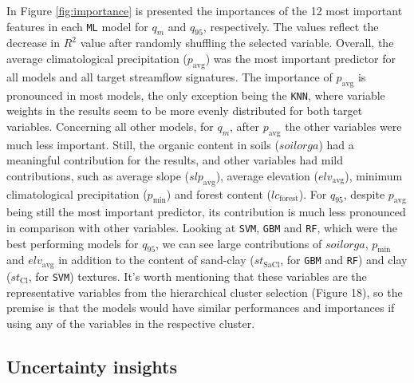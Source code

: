 \documentclass[12pt]{article}
\begin{document}
\par In Figure \ref{fig:importance} is presented the importances of the 12 most important features in each \texttt{ML} model for $q_{m}$ and $q_{95}$, respectively. The values reflect the decrease in $R^2$ value after randomly shuffling the selected variable. Overall, the average climatological precipitation ($p_{\text{avg}}$) was the most important predictor for all models and all target streamflow signatures. The importance of $p_{\text{avg}}$ is pronounced in most models, the only exception being the \texttt{KNN}, where variable weights in the results seem to be more evenly distributed for both target variables. Concerning all other models, for $q_{m}$, after $p_{\text{avg}}$ the other variables were much less important. Still, the organic content in soils ($soilorga$) had a meaningful contribution for the results, and other variables had mild contributions, such as average slope ($slp_{\text{avg}}$), average elevation ($elv_{\text{avg}}$), minimum climatological precipitation ($p_{\text{min}}$) and forest content ($lc_{\text{forest}}$). For $q_{95}$, despite $p_{\text{avg}}$ being still the most important predictor, its contribution is much less pronounced in comparison with other variables. Looking at \texttt{SVM}, \texttt{GBM} and \texttt{RF}, which were the best performing models for $q_{95}$, we can see large contributions of $soilorga$, $p_{\text{min}}$ and $elv_{\text{avg}}$ in addition to the content of sand-clay ($st_{\text{SaCl}}$, for \texttt{GBM} and \texttt{RF}) and clay ($st_{\text{Cl}}$, for \texttt{SVM}) textures. It’s worth mentioning that these variables are the representative variables from the hierarchical cluster selection (Figure 18), so the premise is that the models would have similar performances and importances if using any of the variables in the respective cluster.

\subsection{Uncertainty insights} \label{results:uncert}
\end{document}

